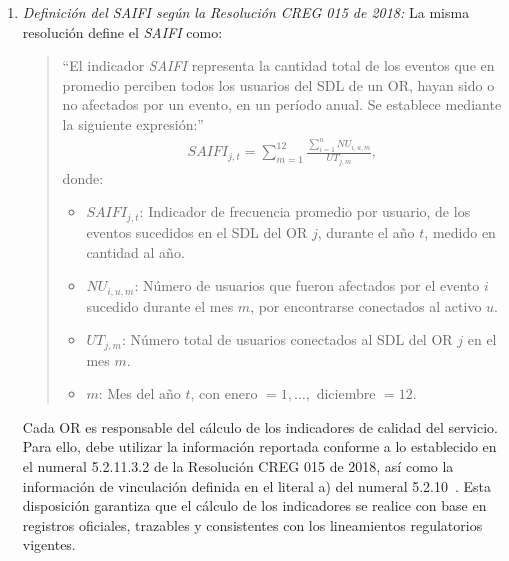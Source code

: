 \begin{enumerate}
    
          \item \textit{Definición del SAIFI según la Resolución CREG 015 de 2018:}
           La misma resolución define el \textit{SAIFI} como:
            \begin{quote}
                ``El indicador \textit{SAIFI} representa la cantidad total de los eventos que en promedio perciben todos los usuarios del SDL de un OR, hayan sido o no afectados por un evento, en un período anual. Se establece mediante la siguiente expresión:''
                \begin{equation}
                    \begin{aligned}
                    SAIFI_{j,t}
                        =
                        \sum_{m=1}^{12}
                        \frac{
                            \sum_{i=1}^{n}
                            NU_{i,u,m}
                        }{
                            UT_{j,m}
                        },
                    \end{aligned}
                \label{eq:saifi_definicion}
                \end{equation}
                donde:
                \begin{itemize}
                    \item $SAIFI_{j,t}$: Indicador de frecuencia promedio por usuario, de los eventos sucedidos en el SDL del OR $j$, durante el año $t$, medido en cantidad al año.
                    \item $NU_{i,u,m}$: Número de usuarios que fueron afectados por el evento $i$ sucedido durante el mes $m$, por encontrarse conectados al activo $u$.
                    \item $UT_{j,m}$: Número total de usuarios conectados al SDL del OR $j$ en el mes $m$.
                    \item $m$: Mes del año $t$, con enero $= 1, \ldots,$ diciembre $= 12$.
                \end{itemize}
            \end{quote}
    
            Cada OR es responsable del cálculo de los indicadores de calidad del servicio. Para ello, debe utilizar la información reportada conforme a lo establecido en el numeral 5.2.11.3.2 de la Resolución CREG 015 de 2018, así como la información de vinculación definida en el literal a) del numeral 5.2.10~\cite{ref1}. Esta disposición garantiza que el cálculo de los indicadores se realice con base en registros oficiales, trazables y consistentes con los lineamientos regulatorios vigentes.


\end{enumerate}
